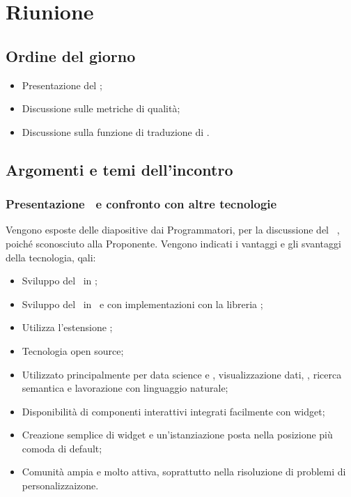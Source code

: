 \section{Riunione}
\subsection{Ordine del giorno}
\begin{itemize}
	\item Presentazione del  ;
	\item Discussione sulle metriche di qualità;
	\item Discussione sulla funzione di traduzione di .
\end{itemize}

\subsection{Argomenti e temi dell'incontro}

\subsubsection{Presentazione \ e confronto con altre tecnologie}

\par Vengono esposte delle diapositive dai Programmatori, per la discussione del \ , poiché sconosciuto alla Proponente. Vengono indicati i vantaggi e gli svantaggi della tecnologia, qali:
\begin{itemize}
	\item Sviluppo del \ in ;
	\item Sviluppo del \ in \ e con implementazioni con la libreria ;
	\item Utilizza l'estensione ;
	\item Tecnologia open source;
	\item Utilizzato principalmente per data science e , visualizzazione dati, , ricerca semantica e lavorazione con linguaggio naturale;
	\item Disponibilità di componenti interattivi integrati facilmente con widget;
	\item Creazione semplice di widget e un'istanziazione posta nella posizione più comoda di default;
	\item Comunità ampia e molto attiva, soprattutto nella risoluzione di problemi di personalizzaizone.
\end{itemize}

